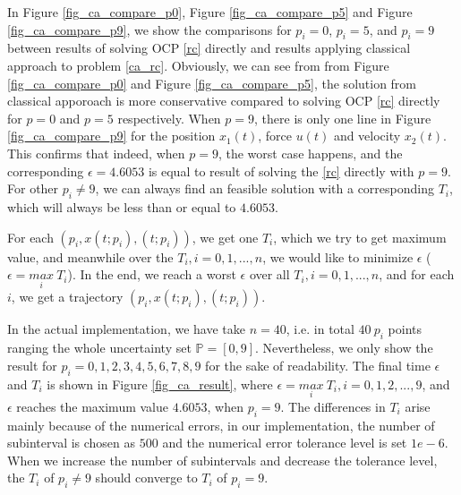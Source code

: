In Figure \ref{fig_ca_compare_p0}, Figure \ref{fig_ca_compare_p5} and Figure \ref{fig_ca_compare_p9}, we show the comparisons for $p_i=0$, $p_i=5$, and $p_i=9$ between results of solving OCP \ref{rc} directly and results applying classical approach to problem \ref{ca_rc}. Obviously, we can see from from Figure \ref{fig_ca_compare_p0} and Figure \ref{fig_ca_compare_p5}, the solution from classical apporoach is more conservative compared to solving OCP \ref{rc} directly for $p=0$ and $p=5$ respectively. When $p=9$, there is only one line in Figure \ref{fig_ca_compare_p9} for the position $x_1(t)$, force $u(t)$ and velocity $x_2(t)$. This confirms that indeed, when $p=9$, the worst case happens, and the corresponding $\epsilon=4.6053$ is equal to result of solving the \ref{rc} directly with $p=9$. For other $p_i \neq 9$, we can always find an feasible solution with a corresponding $T_i$, which will always be less than or equal to $4.6053$. 





For each $(p_i, x(t;p_i), (t;p_i))$, we get one $T_i$, which we try to get maximum value, and meanwhile over the $T_i, i =0, 1, ..., n$, we would like to minimize $\epsilon$ ($\epsilon = \underset{i}{max} \ T_i$). In the end, we reach a worst $\epsilon$ over all $T_i, i =0, 1, ..., n$, and for each $i$, we get a trajectory $(p_i, x(t;p_i), (t;p_i))$. 

In the actual implementation, we have take $n=40$, i.e. in total $40 \ p_i$ points ranging the whole uncertainty set $\mathbb{P}=[0,9]$. Nevertheless, we only show the result for $p_i=0, 1, 2, 3, 4, 5, 6, 7, 8, 9$ for the sake of readability. The final time $\epsilon$ and $T_i$  is shown in Figure \ref{fig_ca_result}, where $\epsilon = \underset{i}{max} \ T_i, i = 0, 1, 2, ..., 9$, and $\epsilon$ reaches the maximum value $4.6053$, when $p_i=9$. The differences in $T_i$ arise mainly because of the numerical errors, in our implementation, the number of subinterval is chosen as $500$ and the numerical error tolerance level is set $1e-6$. When we increase the number of subintervals and decrease the tolerance level, the $T_i$ of $p_i\neq 9$ should converge to $T_i$ of $p_i=9$. 


